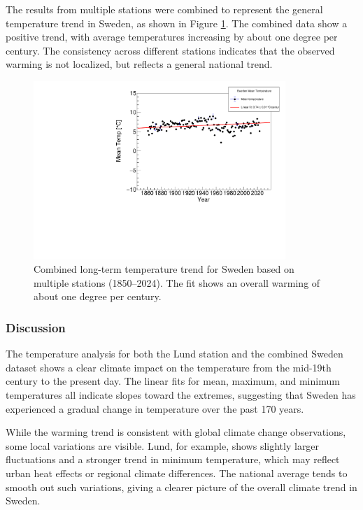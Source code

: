 The results from multiple stations were combined to represent the general temperature trend in Sweden, as shown in Figure \ref{fig:sweden_trend}. The combined data show a positive trend, with average temperatures increasing by about one degree per century. The consistency across different stations indicates that the observed warming is not localized, but reflects a general national trend.

\begin{figure}[H]
    \centering
    \includegraphics[width=0.85\textwidth]{../plots/mean_temps/Sweden_mean_trend.pdf}
    \caption{Combined long-term temperature trend for Sweden based on multiple stations (1850--2024). The fit shows an overall warming of about one degree per century.}
    \label{fig:sweden_trend}
\end{figure}

\subsubsection{Discussion}

The temperature analysis for both the Lund station and the combined Sweden dataset shows a clear climate impact on the temperature from the mid-19th century to the present day. The linear fits for mean, maximum, and minimum temperatures all indicate slopes toward the extremes, suggesting that Sweden has experienced a gradual change in temperature over the past 170 years.

While the warming trend is consistent with global climate change observations, some local variations are visible. Lund, for example, shows slightly larger fluctuations and a stronger trend in minimum temperature, which may reflect urban heat effects or regional climate differences. The national average tends to smooth out such variations, giving a clearer picture of the overall climate trend in Sweden.

